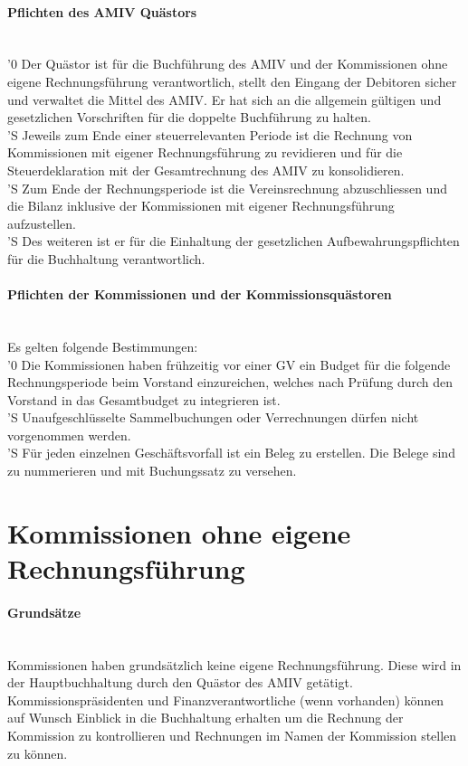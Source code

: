 \documentclass[a4paper,11pt]{article}
\newcommand{\nl}{\\[1.5ex]}
\begin{document}
\paragraph{Pflichten des AMIV Quästors} \ \\
'0 Der Quästor ist für die Buchführung des AMIV und der Kommissionen ohne eigene Rechnungsführung verantwortlich, stellt den Eingang der Debitoren sicher und verwaltet die Mittel des AMIV. Er hat sich an die allgemein gültigen und gesetzlichen Vorschriften für die doppelte Buchführung zu halten.\nl
'S Jeweils zum Ende einer steuerrelevanten Periode ist die Rechnung von Kommissionen mit eigener Rechnungsführung zu revidieren und für die Steuerdeklaration mit der Gesamtrechnung des AMIV zu konsolidieren.\nl
'S Zum Ende der Rechnungsperiode ist die Vereinsrechnung abzuschliessen und die Bilanz inklusive der Kommissionen mit eigener Rechnungsführung aufzustellen.\nl
'S Des weiteren ist er für die Einhaltung der gesetzlichen Aufbewahrungspflichten für die Buchhaltung verantwortlich.


\paragraph{Pflichten der Kommissionen und der Kommissionsquästoren} \ \\
Es gelten folgende Bestimmungen: \nl %
'0 Die Kommissionen haben frühzeitig vor einer GV ein Budget für die folgende Rechnungsperiode beim Vorstand einzureichen, welches nach Prüfung durch den Vorstand in das Gesamtbudget zu integrieren ist.\nl
'S Unaufgeschlüsselte Sammelbuchungen oder Verrechnungen dürfen nicht vorgenommen werden.\nl
'S Für jeden einzelnen Geschäftsvorfall ist ein Beleg zu erstellen. Die Belege sind zu nummerieren und mit Buchungssatz zu versehen.


\section*{Kommissionen ohne eigene Rechnungsführung}
\paragraph{Grundsätze} \ \\
Kommissionen haben grundsätzlich keine eigene Rechnungsführung. Diese wird in der Hauptbuchhaltung durch den Quästor des AMIV getätigt. Kommissionspräsidenten und Finanzverantwortliche (wenn vorhanden) können auf Wunsch Einblick in die Buchhaltung erhalten um die Rechnung der Kommission zu kontrollieren und Rechnungen im Namen der Kommission stellen zu können.
\end{document}
